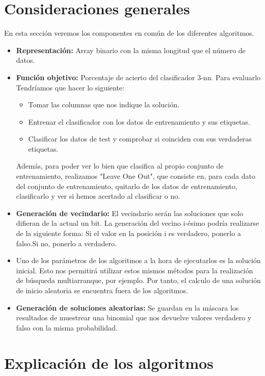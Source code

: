 \section{Consideraciones generales}
En esta sección veremos los componentes en común de los diferentes algoritmos.
\begin{itemize}
\item \textbf{Representación:} Array binario con la misma longitud que el número de datos.
\item \textbf{Función objetivo:} Porcentaje de acierto del clasificador 3-nn. Para evaluarlo Tendríamos que hacer lo siguiente:
\begin{itemize}
\item Tomar las columnas que nos indique la solución.
\item Entrenar el clasificador con los datos de entrenamiento y sus etiquetas.
\item Clasificar los datos de test y comprobar si coinciden con sus verdaderas etiquetas.
\end{itemize} 
Además, para poder ver lo bien que clasifica al propio conjunto de entrenamiento, realizamos "Leave One Out", que consiste en, para cada dato del conjunto de entrenamiento, quitarlo de los datos de entrenamiento, clasificarlo y ver si hemos acertado al clasificar o no.
\item \textbf{Generación de vecindario:} El vecindario serán las soluciones que solo difieran de la actual un bit. La generación del vecino i-ésimo podría realizarse de la siguiente forma: Si el valor en la posición i es verdadero, ponerlo a falso.Si no, ponerlo a verdadero. 
\item Uno de los parámetros de los algoritmos a la hora de ejecutarlos es la solución inicial. Esto nos permitirá utilizar estos mismos métodos para la realización de búsqueda multiarranque, por ejemplo. Por tanto, el calculo de una solución de inicio aleatoria se encuentra fuera de los algoritmos.
\item \textbf{Generación de soluciones aleatorias:} Se guardan en la máscara los resultados de muestrear una binomial que nos devuelve valores verdadero y falso con la misma probabilidad.
\end{itemize}
\newpage
\section{Explicación de los algoritmos}

